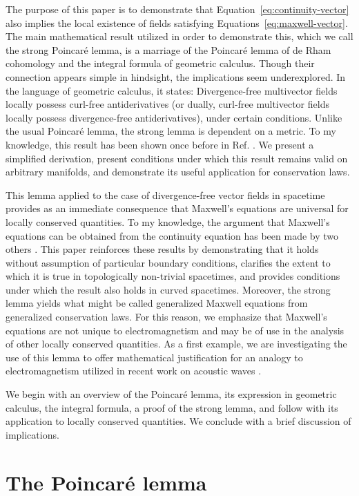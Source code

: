 \documentclass[twocolumn,notitlepage,nofootinbib,tightenlines]{revtex4-1}
\theoremstyle{definition}
\theoremstyle{remark}
\numberwithin{equation}{section}
\begin{document}
The purpose of this paper is to demonstrate that Equation~\ref{eq:continuity-vector} also implies the local existence of fields satisfying Equations~\ref{eq:maxwell-vector}. The main mathematical result utilized in order to demonstrate this, which we call the strong Poincar\'e lemma, is a marriage of the Poincar\'e lemma of de Rham cohomology and the integral formula of geometric calculus. Though their connection appears simple in hindsight, the implications seem underexplored. In the language of geometric calculus, it states: Divergence-free multivector fields locally possess curl-free antiderivatives (or dually, curl-free multivector fields locally possess divergence-free antiderivatives), under certain conditions. Unlike the usual Poincar\'e lemma, the strong lemma is dependent on a metric. To my knowledge, this result has been shown once before in Ref. \cite{brackx}. We present a simplified derivation, present conditions under which this result remains valid on arbitrary manifolds, and demonstrate its useful application for conservation laws.

This lemma applied to the case of divergence-free vector fields in spacetime provides as an immediate consequence that Maxwell's equations are universal for locally conserved quantities. To my knowledge, the argument that Maxwell's equations can be obtained from the continuity equation has been made by two others \cite{heras, macdonald}. This paper reinforces these results by demonstrating that it holds without assumption of particular boundary conditions, clarifies the extent to which it is true in topologically non-trivial spacetimes, and provides conditions under which the result also holds in curved spacetimes. Moreover, the strong lemma yields what might be called generalized Maxwell equations from generalized conservation laws. For this reason, we emphasize that Maxwell's equations are not unique to electromagnetism and may be of use in the analysis of other locally conserved quantities. As a first example, we are investigating the use of this lemma to offer mathematical justification for an analogy to electromagnetism utilized in recent work on acoustic waves \cite{bliokh1, bliokh2, shi, burns}.

We begin with an overview of the Poincar\'e lemma, its expression in geometric calculus, the integral formula, a proof of the strong lemma, and follow with its application to locally conserved quantities. We conclude with a brief discussion of implications.

\section{The Poincar\'e lemma}
\end{document}
